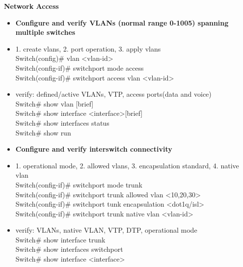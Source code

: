\documentclass{article}
\begin{document}
\begin{flushleft}\textbf{Network Access}\end{flushleft}
\begin{itemize}
  \item \textbf{Configure and verify VLANs (normal range 0-1005) spanning multiple switches}
	\item[] 1. create vlans, 2. port operation, 3. apply vlans\\
		Switch(config)\# vlan \textless vlan-id\textgreater\\
		Switch(config-if)\# switchport mode access\\
		Switch(config-if)\# switchport access vlan \textless vlan-id\textgreater
  	\item[] verify: defined/active VLANs, VTP, access ports(data and voice)\\
  		Switch\# show vlan [brief]\\
  		Switch\# show interface \textless interface\textgreater [brief]\\
  		Switch\# show interfaces status\\
  		Switch\# show run
  	
  \item \textbf{Configure and verify interswitch connectivity}
  	\item[] 1. operational mode, 2. allowed vlans, 3. encapsulation standard, 4. native vlan\\
  		Switch(config-if)\# switchport mode trunk\\
  		Switch(config-if)\# switchport trunk allowed vlan \textless 10,20,30\textgreater\\
  		Switch(config-if)\# switchport tunk encapsulation \textless dot1q/isl\textgreater\\
  		Switch(config-if)\# switchport trunk native vlan \textless vlan-id\textgreater
  	\item[] verify: VLANs, native VLAN, VTP, DTP, operational mode \\
  		Switch\# show interface trunk\\
  		Switch\# show interfaces switchport\\
  		Switch\# show interface \textless interface\textgreater
  		

\end{itemize}
\end{document}
